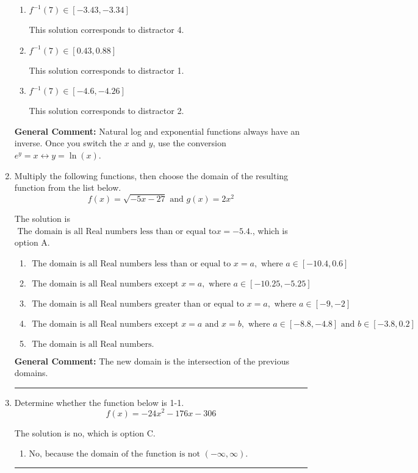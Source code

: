 \documentclass{extbook}[14pt]
\newcommand{\litem}[1]{\item #1

\rule{\textwidth}{0.4pt}}
\begin{document}
\begin{enumerate}
{\begin{enumerate}[label=\Alph*.]
 This solution corresponds to distractor 3.
\item \( f^{-1}(7) \in [-3.43, -3.34] \)

 This solution corresponds to distractor 4.
\item \( f^{-1}(7) \in [0.43, 0.88] \)

 This solution corresponds to distractor 1.
\item \( f^{-1}(7) \in [-4.6, -4.26] \)

 This solution corresponds to distractor 2.
\end{enumerate}

\textbf{General Comment:} Natural log and exponential functions always have an inverse. Once you switch the $x$ and $y$, use the conversion $ e^y = x \leftrightarrow y=\ln(x)$.
}
\litem{
Multiply the following functions, then choose the domain of the resulting function from the list below.
\[ f(x) = \sqrt{-5x-27}  \text{ and } g(x) = 2x^{2} \]

The solution is \( \text{ The domain is all Real numbers less than or equal to} x = -5.4. \), which is option A.\begin{enumerate}[label=\Alph*.]
\item \( \text{ The domain is all Real numbers less than or equal to } x = a, \text{ where } a \in [-10.4, 0.6] \)


\item \( \text{ The domain is all Real numbers except } x = a, \text{ where } a \in [-10.25, -5.25] \)


\item \( \text{ The domain is all Real numbers greater than or equal to } x = a, \text{ where } a \in [-9, -2] \)


\item \( \text{ The domain is all Real numbers except } x = a \text{ and } x = b, \text{ where } a \in [-8.8, -4.8] \text{ and } b \in [-3.8, 0.2] \)


\item \( \text{ The domain is all Real numbers. } \)


\end{enumerate}

\textbf{General Comment:} The new domain is the intersection of the previous domains.
}
\litem{
Determine whether the function below is 1-1.
\[ f(x) = -24 x^2 - 176 x - 306 \]

The solution is \( \text{no} \), which is option C.\begin{enumerate}[label=\Alph*.]
\item \( \text{No, because the domain of the function is not $(-\infty, \infty)$.} \)


\end{enumerate}}
\end{enumerate}
\end{document}
